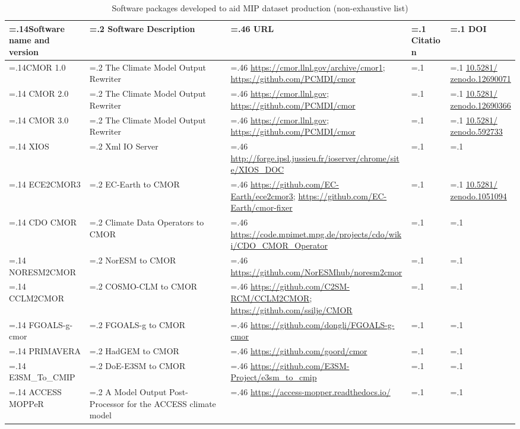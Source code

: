 \documentclass[manuscript]{copernicus}
\begin{document}
\begin{table}[htp]
\renewcommand{\arraystretch}{2}
\scriptsize
\centering
\caption{Software packages developed to aid MIP dataset production (non-exhaustive list)}
\resizebox{\textwidth}{!} {
	\begin{tabularx}{0.9\textwidth} { 
	  | >{\raggedright\arraybackslash\hsize=.14\hsize}X
	  | >{\centering\arraybackslash\hsize=.2\hsize}X
	  | >{\centering\arraybackslash\hsize=.46\hsize}X
	  | >{\centering\arraybackslash\hsize=.1\hsize}X
	  | >{\centering\arraybackslash\hsize=.1\hsize}X | }
\hline
\textbf{Software name and version} & \textbf{Software Description} & \textbf{URL} & \textbf{Citation} & \textbf{DOI}\\ \hline
CMOR 1.0 & The Climate Model Output Rewriter & \url{https://cmor.llnl.gov/archive/cmor1}; \url{https://github.com/PCMDI/cmor} & \citet{taylor_cmor_2006} & \href{http://doi.org/10.5281/zenodo.12690071}{10.5281/ zenodo.12690071}\\ \hline
CMOR 2.0 & The Climate Model Output Rewriter & \url{https://cmor.llnl.gov}; \url{https://github.com/PCMDI/cmor} & \citet{doutriaux_cmor_2011} & \href{http://doi.org/10.5281/zenodo.12690366}{10.5281/ zenodo.12690366}\\ \hline
CMOR 3.0 & The Climate Model Output Rewriter & \url{https://cmor.llnl.gov}; \url{https://github.com/PCMDI/cmor} & \citet{doutriaux_cmor_2024} & \href{http://doi.org/10.5281/zenodo.592733}{10.5281/ zenodo.592733}\\ \hline
XIOS & Xml IO Server & \url{http://forge.ipsl.jussieu.fr/ioserver/chrome/site/XIOS\_DOC} & &\\ \hline
ECE2CMOR3 & EC-Earth to CMOR & \url{https://github.com/EC-Earth/ece2cmor3}; \url{https://github.com/EC-Earth/cmor-fixer} & & \href{http://doi.org/10.5281/zenodo.1051094}{10.5281/ zenodo.1051094}\\ \hline
CDO CMOR & Climate Data Operators to CMOR & \url{https://code.mpimet.mpg.de/projects/cdo/wiki/CDO\_CMOR\_Operator} & &\\ \hline
NORESM2CMOR & NorESM to CMOR & \url{https://github.com/NorESMhub/noresm2cmor} & &\\ \hline
CCLM2CMOR & COSMO-CLM to CMOR & \url{https://github.com/C2SM-RCM/CCLM2CMOR}; \url{https://github.com/ssilje/CMOR} & &\\ \hline
FGOALS-g-cmor & FGOALS-g to CMOR & \url{https://github.com/dongli/FGOALS-g-cmor} & &\\ \hline
PRIMAVERA & HadGEM to CMOR & \url{https://github.com/goord/cmor} & &\\ \hline
E3SM\_To\_CMIP & DoE-E3SM to CMOR & \url{https://github.com/E3SM-Project/e3sm\_to\_cmip} & &\\ \hline
ACCESS MOPPeR & A Model Output Post-Processor for the ACCESS climate model & \url{https://access-mopper.readthedocs.io/} & &\\
\hline
\end{tabularx}
} %
\label{tab:tabAppD1-CMIP6PrepTools}
\footnotesize{}
\end{table}
\end{document}
